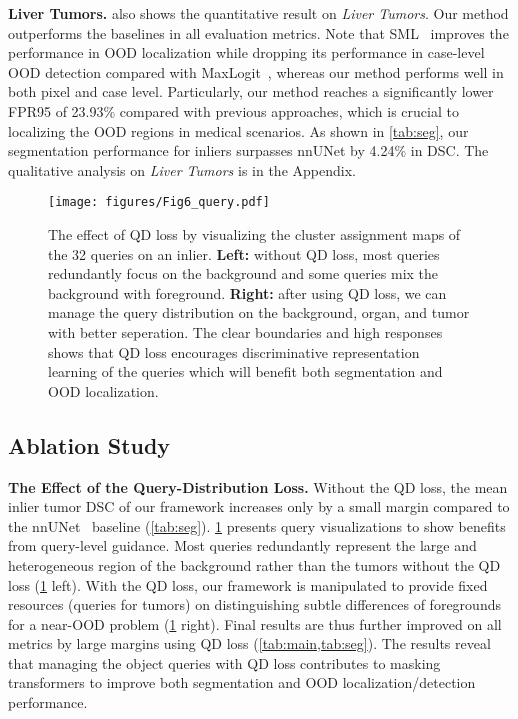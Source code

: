 \documentclass[10pt,twocolumn,letterpaper]{article}
\begin{document}
\textbf{Liver Tumors.}  also shows the quantitative result on \textit{Liver Tumors}. Our method outperforms the baselines in all evaluation metrics. Note that SML~\cite{jung2021standardized} improves the performance in OOD localization while dropping its performance in case-level OOD detection compared with MaxLogit~\cite{hendrycks2019scaling}, whereas our method performs well in both pixel and case level. Particularly, our method reaches a significantly lower FPR95 of 23.93\% compared with previous approaches, which is crucial to localizing the OOD regions in medical scenarios. As shown in \cref{tab:seg}, our segmentation performance for inliers surpasses nnUNet by 4.24\% in DSC. The qualitative analysis on \textit{Liver Tumors} is in the Appendix.

\begin{figure}[ht]
  \centering
  \texttt{[image: figures/Fig6\_query.pdf]}
  \caption{The effect of QD loss by visualizing the cluster assignment maps of the 32 queries on an inlier. {\bf Left:} without QD loss, most queries redundantly focus on the background and some queries mix the background with foreground. {\bf Right:} after using QD loss, we can manage the query distribution on the background, organ, and tumor with better seperation. The clear boundaries and high responses shows that QD loss encourages discriminative representation learning of the queries which will benefit both segmentation and OOD localization.  }
  \label{fig:vis_wo_qd} \vspace{-2mm}
\end{figure} 
\subsection{Ablation Study}
\label{sec:ablation}

{\bf The Effect of the Query-Distribution Loss.}  Without the QD loss, the mean inlier tumor DSC of our framework increases only by a small margin compared to the nnUNet~\cite{isensee2021nnu} baseline (\cref{tab:seg}).  \cref{fig:vis_wo_qd} presents query visualizations to  show benefits from query-level guidance. Most queries redundantly represent the large and heterogeneous region of the background rather than the tumors without the QD loss (\cref{fig:vis_wo_qd} left). With the QD loss, our framework is manipulated to provide fixed resources (queries for tumors) on distinguishing subtle differences of foregrounds for a near-OOD problem (\cref{fig:vis_wo_qd} right). Final results are thus further improved on all metrics by large margins using QD loss (\cref{tab:main,tab:seg}). The results reveal that managing the object queries with QD loss contributes to masking transformers to improve both segmentation and OOD localization/detection performance.
\end{document}
